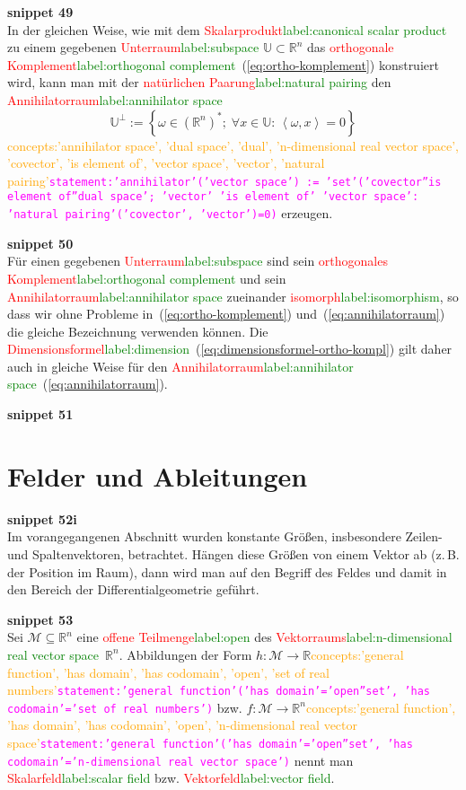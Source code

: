 \documentclass[a4paper,twoside,english,ngerman,deutsch,german,sectrefs,envcountsame,envcountchap]{svmono}
\newcommand{\setref}[2]{\textcolor{red}{#1}\textcolor{green}{#2}}
\newcommand{\snippet}[1]{\textbf{snippet #1}\\}
\newcommand{\eqnote}[2]{\textcolor{orange}{#1}\textcolor{magenta}{\texttt{#2}}}
\begin{document}
\snippet{49}
In der gleichen Weise, wie mit dem \setref{Skalarprodukt}{label:canonical scalar product} zu einem gegebenen \setref{Unterraum}{label:subspace} $\mathbb{U}\subset{\mathbb{R}}^{n}$ das \setref{orthogonale Komplement}{label:orthogonal complement}~(\eqref{eq:ortho-komplement}) konstruiert wird, kann man mit der \setref{natürlichen Paarung}{label:natural pairing} den \setref{Annihilatorraum}{label:annihilator space}
\begin{equation}
\mathbb{U}^{\perp}:=\left\{ \omega\in({\mathbb{R}}^{n})^{*};\;\forall x\in\mathbb{U}:\,\left\langle \omega,x\right\rangle =0\right\} \label{eq:annihilatorraum}
\end{equation}\eqnote{concepts:'annihilator space', 'dual space', 'dual', 'n-dimensional real vector space', 'covector', 'is element of', 'vector space', 'vector', 'natural pairing'}{statement:'annihilator'('vector space') := 'set'('covector''is element of''dual space'; 'vector' 'is element of' 'vector space': 'natural pairing'('covector', 'vector')=0)}
erzeugen.

\snippet{50}
Für einen gegebenen \setref{Unterraum}{label:subspace} sind sein \setref{orthogonales Komplement}{label:orthogonal complement} und sein \setref{Annihilatorraum}{label:annihilator space} zueinander \setref{isomorph}{label:isomorphism}, so dass wir ohne Probleme in~(\eqref{eq:ortho-komplement}) und~(\eqref{eq:annihilatorraum}) die gleiche Bezeichnung verwenden können. Die \setref{Dimensionsformel}{label:dimension}~(\eqref{eq:dimensionsformel-ortho-kompl}) gilt daher auch in gleiche Weise für den \setref{Annihilatorraum}{label:annihilator space}~(\eqref{eq:annihilatorraum}).

\snippet{51}
\section{Felder und Ableitungen\label{sec:Felder-und-Ableitungen}}

\snippet{52i}
Im vorangegangenen Abschnitt wurden konstante Größen, insbesondere
Zeilen- und Spaltenvektoren, betrachtet. Hängen diese Größen von einem
Vektor ab (z.\,B. der Position im Raum), dann wird man auf den Begriff
des Feldes und damit in den Bereich der Differentialgeometrie geführt.

\snippet{53}
Sei $\mathcal{M}\subseteq{\mathbb{R}}^{n}$ eine \setref{offene Teilmenge}{label:open} des \setref{Vektorraums}{label:n-dimensional real vector space}~${\mathbb{R}}^{n}$.
Abbildungen der Form $h:\mathcal{M}\to{\mathbb{R}}$\eqnote{concepts:'general function', 'has domain', 'has codomain', 'open', 'set of real numbers'}{statement:'general function'('has domain'='open''set', 'has codomain'='set of real numbers')} bzw. $f:\mathcal{M}\to{\mathbb{R}}^{n}$\eqnote{concepts:'general function', 'has domain', 'has codomain', 'open', 'n-dimensional real vector space'}{statement:'general function'('has domain'='open''set', 'has codomain'='n-dimensional real vector space')}
nennt man \setref{Skalarfeld}{label:scalar field} bzw. \setref{Vektorfeld}{label:vector field}.
\end{document}
